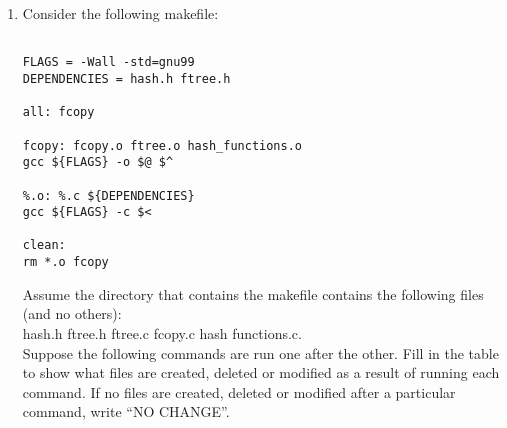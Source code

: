 \documentclass[11pt]{article}
\begin{document}
\begin{enumerate}
	\newpage
	\item Consider the following makefile:
	\begin{Verbatim}

FLAGS = -Wall -std=gnu99
DEPENDENCIES = hash.h ftree.h

all: fcopy

fcopy: fcopy.o ftree.o hash_functions.o
gcc ${FLAGS} -o $@ $^

%.o: %.c ${DEPENDENCIES}
gcc ${FLAGS} -c $<

clean:
rm *.o fcopy
	\end{Verbatim}

		Assume the directory that contains the makefile contains the following files (and no others):\\

		hash.h ftree.h ftree.c fcopy.c hash functions.c.\\

		Suppose the following commands are run one after the other. Fill in the table to show what files are created, deleted or modified as a result of running each command. If no files are created, deleted or modified after a particular command, write “NO CHANGE”.

\end{enumerate}
\end{document}
